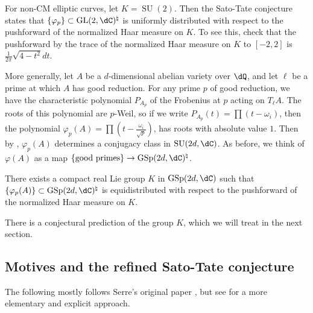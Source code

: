 For non-CM elliptic curves, let $K=\operatorname{SU}(2)$. Then the Sato-Tate 
conjecture states that $\{\varphi_p\}\subset \gl{2}{\dC}^\natural$ is 
uniformly distributed with respect to the pushforward of the normalized Haar 
measure on $K$. To see this, check that the pushforward by the trace of the 
normalized Haar measure on $K$ to $[-2,2]$ is $\frac{1}{2\pi} \sqrt{4-t^2} dt$. 

More generally, let $A$ be a $d$-dimensional abelian variety over $\dQ$, and 
let $\ell$ be a prime at which $A$ has good reduction. For any prime $p$ of 
good reduction, we have the characteristic polynomial $P_{A_p}$ of the 
Frobenius at $p$ acting on $T_\ell A$. The roots of this polynomial are 
$p$-Weil, so if we write $P_{A_p}(t) = \prod (t-\omega_i)$, then the polynomial 
$\varphi_p(A) = \prod \left(t-\frac{\omega_i}{\sqrt p}\right)$, has roots with 
absolute value $1$. Then by \cite[13.1]{ka88}, $\varphi_p(A)$ determines a 
conjugacy class in $\operatorname{SU}(2 d,\dC)$. As before, we think of 
$\varphi(A)$ as a map 
$\{\text{good primes}\}\to \operatorname{GSp}(2 d,\dC)^\natural$. 

\begin{conjecture}[Serre]
There exists a compact real Lie group $K$ in $\operatorname{GSp}(2d,\dC)$ such 
that $\{\varphi_p(A)\}\subset \operatorname{GSp}(2 d,\dC)^\natural$ is 
equidistributed with respect to the pushforward of the normalized Haar 
measure on $K$. 
\end{conjecture}

There is a conjectural prediction of the group $K$, which we will treat in the 
next section. 





\subsection{Motives and the refined Sato-Tate conjecture}

The following mostly follows Serre's original paper \cite{se94}, but see 
\cite{se12} for a more elementary and explicit approach. 

